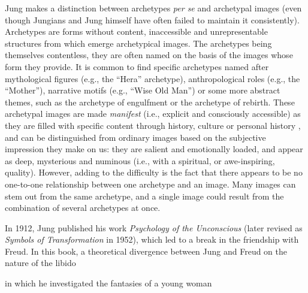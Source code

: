 \documentclass[
]{book}
\begin{document}
Jung makes a distinction between archetypes \emph{per se} and archetypal images (even though Jungians and Jung himself have often failed to maintain it consistently). Archetypes are forms without content, inaccessible and unrepresentable structures from which emerge archetypical images. The archetypes being themselves contentless, they are often named on the basis of the images whose form they provide. It is common to find specific archetypes named after mythological figures (e.g., the ``Hera'' archetype), anthropological roles (e.g., the ``Mother''), narrative motifs (e.g., ``Wise Old Man'') or some more abstract themes, such as the archetype of engulfment or the archetype of rebirth. These archetypal images are made \emph{manifest} (i.e., explicit and consciously accessible) as they are filled with specific content through history, culture or personal history \citep{papadopoulos2012}, and can be distinguished from ordinary images based on the subjective impression they make on us: they are salient and emotionally loaded, and appear as deep, mysterious and numinous (i.e., with a spiritual, or awe-inspiring, quality). However, adding to the difficulty is the fact that there appears to be no one-to-one relationship between one archetype and an image. Many images can stem out from the same archetype, and a single image could result from the combination of several archetypes at once.

In 1912, Jung published his work \emph{Psychology of the Unconscious} (later revised as \emph{Symbols of Transformation} in 1952), which led to a break in the friendship with Freud. In this book, a theoretical divergence between Jung and Freud on the nature of the libido

in which he investigated the fantasies of a young woman
\end{document}

